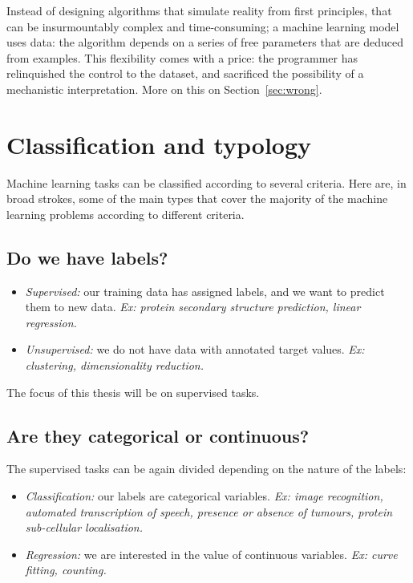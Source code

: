 Instead of designing algorithms that simulate reality from first principles, that can be insurmountably complex and time-consuming; a machine learning model uses data: the algorithm depends on a series of free parameters that are deduced from examples.
This flexibility comes with a price: the programmer has relinquished the control to the dataset, and sacrificed the possibility of a mechanistic interpretation.
More on this on Section~\ref{sec:wrong}.

\section{Classification and typology}
Machine learning tasks can be classified according to several criteria.
Here are, in broad strokes, some of the main types that cover the majority of the machine learning problems according to different criteria.

\subsection{Do we have labels?}
\begin{itemize}
\item \emph{Supervised:} our training data has assigned labels, and we want to predict them to new data. \emph{Ex: protein secondary structure prediction, linear regression.}
\item \emph{Unsupervised:} we do not have data with annotated target values. \emph{Ex: clustering, dimensionality reduction.}
\end{itemize}

The focus of this thesis will be on supervised tasks.

\subsection[Categorical or continuous?]{Are they categorical or continuous?}
The supervised tasks can be again divided depending on the nature of the labels:
\begin{itemize}
\item \emph{Classification:} our labels are categorical variables. \emph{Ex: image recognition, automated transcription of speech, presence or absence of tumours, protein sub-cellular localisation.}
\item \emph{Regression:} we are interested in the value of continuous variables. \emph{Ex: curve fitting, counting.}
\end{itemize}

